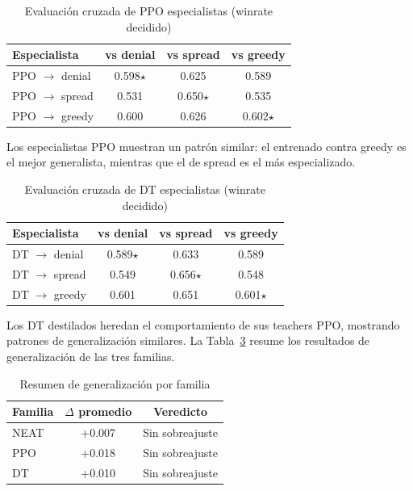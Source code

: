\begin{table}[H]
\centering
\caption{Evaluación cruzada de PPO especialistas (winrate decidido)}
\begin{tabular}{lccc}
\hline
\textbf{Especialista} & \textbf{vs denial} & \textbf{vs spread} & \textbf{vs greedy} \\
\hline
PPO $\to$ denial & 0.598$\star$ & 0.625 & 0.589 \\
PPO $\to$ spread & 0.531 & 0.650$\star$ & 0.535 \\
PPO $\to$ greedy & 0.600 & 0.626 & 0.602$\star$ \\
\hline
\end{tabular}
\label{tab:cross_ppo}
\end{table}

Los especialistas PPO muestran un patrón similar: el entrenado contra greedy es el mejor generalista, mientras que el de spread es el más especializado.

\begin{table}[H]
\centering
\caption{Evaluación cruzada de DT especialistas (winrate decidido)}
\begin{tabular}{lccc}
\hline
\textbf{Especialista} & \textbf{vs denial} & \textbf{vs spread} & \textbf{vs greedy} \\
\hline
DT $\to$ denial & 0.589$\star$ & 0.633 & 0.589 \\
DT $\to$ spread & 0.549 & 0.656$\star$ & 0.548 \\
DT $\to$ greedy & 0.601 & 0.651 & 0.601$\star$ \\
\hline
\end{tabular}
\label{tab:cross_dt}
\end{table}

Los DT destilados heredan el comportamiento de sus teachers PPO, mostrando patrones de generalización similares. La Tabla~\ref{tab:generalization} resume los resultados de generalización de las tres familias.

\begin{table}[H]
\centering
\caption{Resumen de generalización por familia}
\begin{tabular}{lcc}
\hline
\textbf{Familia} & \textbf{$\Delta$ promedio} & \textbf{Veredicto} \\
\hline
NEAT & +0.007 & Sin sobreajuste \\
PPO  & +0.018 & Sin sobreajuste \\
DT   & +0.010 & Sin sobreajuste \\
\hline
\end{tabular}
\label{tab:generalization}
\end{table}

